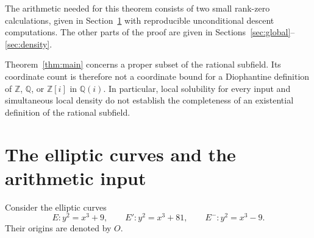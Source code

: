 \documentclass[11pt,a4paper]{article}
\theoremstyle{definition}
\newcommand{\Q}{\mathbb Q}\newcommand{\Z}{\mathbb Z}
\begin{document}
The arithmetic needed for this theorem consists of two small rank-zero
calculations, given in Section~\ref{sec:arithmetic} with reproducible
unconditional descent computations. The other parts of the proof are
given in Sections~\ref{sec:global}--\ref{sec:density}.

Theorem~\ref{thm:main} concerns a proper subset of the rational subfield.
Its coordinate count is therefore not a coordinate bound for a
Diophantine definition of $\Z$, $\Q$, or $\Z[i]$ in $\Q(i)$.
In particular, local solubility for every input and simultaneous
local density do not establish the completeness of an existential
definition of the rational subfield.

\section{The elliptic curves and the arithmetic input}\label{sec:arithmetic}

Consider the elliptic curves
\[
 E:y^2=x^3+9,\qquad
 E':y^2=x^3+81,\qquad
 E^-:y^2=x^3-9.
\]
Their origins are denoted by $O$.
\end{document}
